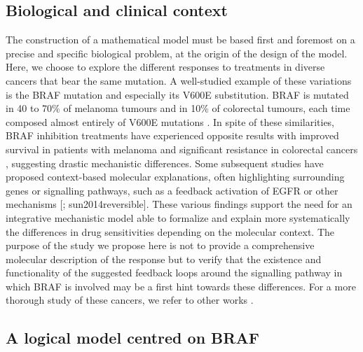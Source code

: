 \documentclass[a4paper,12pt,twoside,onecolumn,openright,final,oldfontcommands]{memoir}
\begin{document}
\subsection{Biological and clinical
context}\label{biological-and-clinical-context}

The construction of a mathematical model must be based first and
foremost on a precise and specific biological problem, at the origin of
the design of the model. Here, we choose to explore the different
responses to treatments in diverse cancers that bear the same mutation.
A well-studied example of these variations is the BRAF mutation and
especially its V600E substitution. BRAF is mutated in 40 to 70\% of
melanoma tumours and in 10\% of colorectal tumours, each time composed
almost entirely of V600E mutations \citep{cantwell2011brafv600e}. In
spite of these similarities, BRAF inhibition treatments have experienced
opposite results with improved survival in patients with melanoma
\citep{chapman2011improved} and significant resistance in colorectal
cancers \citep{kopetz2010plx4032}, suggesting drastic mechanistic
differences. Some subsequent studies have proposed context-based
molecular explanations, often highlighting surrounding genes or
signalling pathways, such as a feedback activation of EGFR
\citep{prahallad2012unresponsiveness} or other mechanisms
{[}\citet{poulikakos2011raf}; sun2014reversible{]}. These various
findings support the need for an integrative mechanistic model able to
formalize and explain more systematically the differences in drug
sensitivities depending on the molecular context. The purpose of the
study we propose here is not to provide a comprehensive molecular
description of the response but to verify that the existence and
functionality of the suggested feedback loops around the signalling
pathway in which BRAF is involved \citep{prahallad2012unresponsiveness}
may be a first hint towards these differences. For a more thorough study
of these cancers, we refer to other works
\citep{eduati2017drug, baur2020connecting, cho2016attractor}.

\subsection{A logical model centred on
BRAF}\label{a-logical-model-centred-on-braf}
\end{document}
